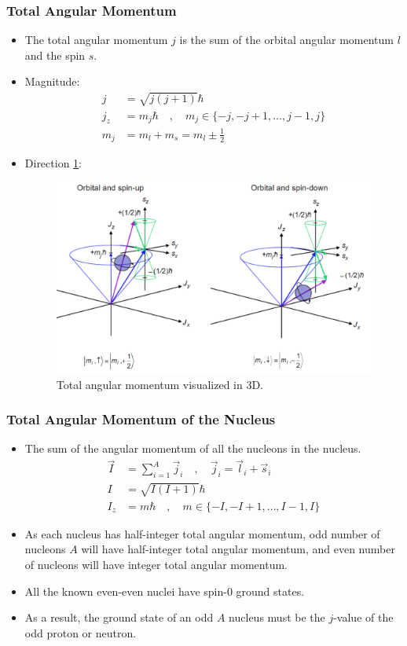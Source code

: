 \documentclass{article}
\begin{document}
\subsubsection{Total Angular Momentum}
\begin{itemize}
    \item The total angular momentum $j$ is the sum of the orbital angular momentum $l$ and the spin $s$.
    \item Magnitude: 
    \begin{align}
    j &= \sqrt{j(j+1)}ℏ \\
    j_z &= m_jℏ \quad , \quad m_j ∈ \{-j, -j+1, \ldots, j-1, j\} \\
    m_j &= m_l + m_s = m_l ± \frac{1}{2}
    \end{align}
    \item Direction \cref{fig: total_angular_momentum_visualized}:
    \begin{figure}[h!]
    \centering
    \includegraphics[width = .75\textwidth]{total_angular_momentum_visualized.png}
    \caption{Total angular momentum visualized in 3D.}
    \label{fig: total_angular_momentum_visualized}
    \end{figure}
\end{itemize}

\subsubsection{Total Angular Momentum of the Nucleus}
\begin{itemize}
    \item The sum of the angular momentum of all the nucleons in the nucleus. 
    \begin{align}
    \vec{I} &= \sum_{i=1}^{A} \vec{j}_i \quad , \quad  \vec{j}_i = \vec{l}_i + \vec{s}_i \\
    I &= \sqrt{I(I+1)}ℏ \\
    I_z &= mℏ \quad , \quad m ∈ \{-I, -I+1, \ldots, I-1, I\}
    \end{align} 
    \item As each nucleus has half-integer total angular momentum, odd number of nucleons $A$ will have half-integer total angular momentum, and even number of nucleons will have integer total angular momentum.
    \item All the known even-even nuclei have spin-0 ground states. 
    \item As a result, the ground state of an odd $A$ nucleus must be the $j$-value of the odd proton or neutron. 
\end{itemize}
\end{document}
